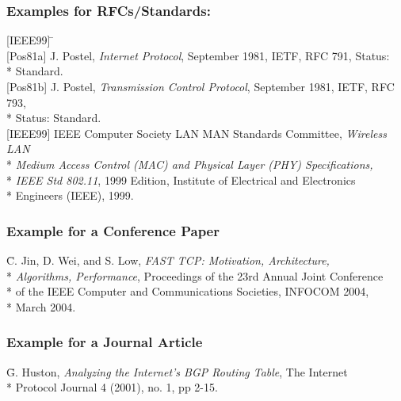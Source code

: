 \subsubsection*{Examples for RFCs/Standards:}
\begin{example}
\begin{tabbing}
  {}[IEEE99] \= \kill \\
  {}[Pos81a] \> J. Postel, \emph{Internet Protocol}, September 1981, IETF, RFC
  791, Status: \\*
  \> Standard.\\
  {}[Pos81b] \> J. Postel, \emph{Transmission Control Protocol}, September
  1981, IETF, RFC 793,\\*
  \> Status: Standard.\\
  {}[IEEE99] \> IEEE Computer Society LAN MAN Standards Committee,
  \emph{Wireless LAN} \\*
  \> \emph{Medium Access Control (MAC) and Physical Layer (PHY)
  Specifications,} \\*
  \> \emph{IEEE Std 802.11}, 1999 Edition, Institute of Electrical and
  Electronics\\*
  \> Engineers (IEEE), 1999.
\end{tabbing}
\end{example}

\subsubsection*{Example for a Conference Paper}
\begin{example}
\begin{tabbing}
  [JWL04] \= C. Jin, D. Wei, and S. Low, \emph{FAST TCP: Motivation,
  Architecture,} \\*
  \> \emph{Algorithms, Performance}, Proceedings of the 23rd Annual Joint
  Conference \\*
  \> of the IEEE Computer and Communications Societies, INFOCOM 2004,
  \\*
  \> March 2004.
\end{tabbing}
\end{example}


\subsubsection*{Example for a Journal Article}
\begin{example}
\begin{tabbing}
  [Hus01] \= G. Huston, \emph{Analyzing the Internet's BGP Routing Table},
 The Internet\\*
 \> Protocol Journal 4 (2001), no. 1, pp 2-15.
\end{tabbing}
\end{example}


